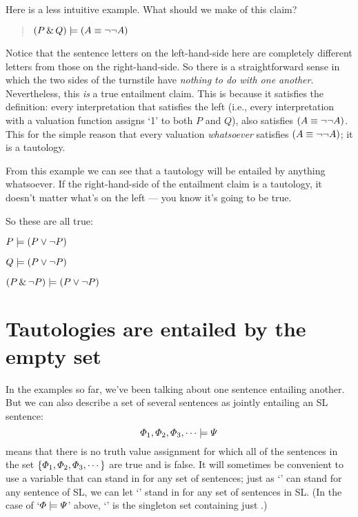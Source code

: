 Here is a less intuitive example. What should we make of this claim?

\begin{quote}
$(P\,\&\, Q) \models (A\equiv\neg\neg A)$
\end{quote}

Notice that the sentence letters on the left-hand-side here are completely different letters from those on the right-hand-side. So there is a straightforward sense in which the two sides of the turnstile have \emph{nothing to do with one another}. Nevertheless, this \emph{is} a true entailment claim. This is because it satisfies the definition: every interpretation that satisfies the left (i.e., every interpretation with a valuation function assigns `1' to both $P$ and $Q$), also satisfies $(A\equiv\neg\neg A)$. This for the simple reason that every valuation \emph{whatsoever} satisfies $(A\equiv\neg\neg A)$; it is a tautology.

From this example we can see that a tautology will be entailed by anything whatsoever. If the right-hand-side of the entailment claim is a tautology, it doesn't matter what's on the left --- you know it's going to be true.

So these are all true:

\begin{earg}
\item[] $P \models (P \vee \neg P)$
\item[] $Q \models (P \vee \neg P)$
\item[] $(P \,\&\, \neg P) \models (P \vee \neg P)$
\end{earg}

\section{Tautologies are entailed by the empty set}

In the examples so far, we've been talking about one sentence entailing another. But we can also describe a set of several sentences as jointly entailing an SL sentence: $$\varPhi{}_1,\varPhi{}_2,\varPhi{}_3,\cdots\models\varPsi{}$$ means that there is no truth value assignment for which all of the sentences in the set $\{\varPhi{}_1,\varPhi{}_2,\varPhi{}_3,\cdots\}$ are true and \metaB{} is false. It will sometimes be convenient to use a variable that can stand in for any set of sentences; just as `\metaA{}' can stand for any sentence of SL, we can let `\metaSetX{}' stand in for any set of sentences in SL. (In the case of `$\varPhi{}\models\varPsi{}$' above, `\metaSetX{}' is the singleton set containing just \metaA{}.)

